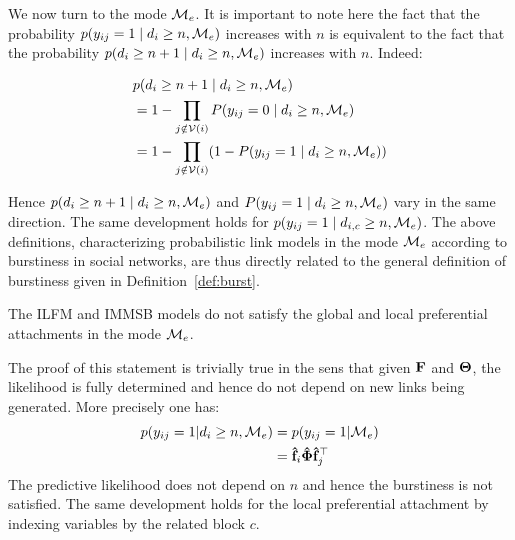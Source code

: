 We now turn to the mode $\mathcal{M}_e$. It is important to note here the fact that the probability $p(y_{ij}=1 \mid d_i \ge n, \mathcal{M}_e)$ increases with $n$ is equivalent to the fact that the probability $p(d_{i} \ge n+1 \mid d_i \ge n, \mathcal{M}_e)$ increases with $n$. Indeed:


\begin{align}
&p(d_{i} \ge n+1 \mid d_i \ge n, \mathcal{M}_e) \nonumber \\
&= 1 - \prod_{j \notin \mathcal{V}(i)} P(y_{ij} = 0 \mid d_i \ge n, \mathcal{M}_e) \nonumber \\
&= 1 - \prod_{j \notin \mathcal{V}(i)} (1 - P(y_{ij} = 1 \mid d_i \ge n, \mathcal{M}_e)) \nonumber
\end{align}


Hence $p(d_{i} \ge n+1 \mid d_i \ge n, \mathcal{M}_e)$ and $P(y_{ij} = 1 \mid d_i \ge n, \mathcal{M}_e)$ vary in the same direction. The same development holds for $p(y_{ij}=1 \mid d_{i,c} \ge n, \mathcal{M}_e)$. The above definitions, characterizing probabilistic link models in the mode $\mathcal{M}_e$ according to burstiness in social networks, are thus directly related to the general definition of burstiness given in Definition~\ref{def:burst}.


\begin{proposition}
	The ILFM and IMMSB models do not satisfy the global and local preferential attachments in the mode $\mathcal{M}_e$.
\end{proposition}

The proof of this statement is trivially true in the sens that given $\mathbf{F}$ and $\mathbf{\Theta}$, the likelihood is fully determined and hence do not depend on new links being generated. More precisely one has:
\begin{align*}
p(y_{ij}=1| d_i \ge n, \mathcal{M}_e) &= p(y_{ij}=1| \mathcal{M}_e)\\
&= \mathbf{\hat{f}}_{i} \mathbf{\hat{\Phi}} \mathbf{\hat{f}}_j^\top
\end{align*}
The predictive likelihood does not depend on $n$ and hence the burstiness is not satisfied. The same development holds for the local preferential attachment by indexing variables by the related block $c$.

